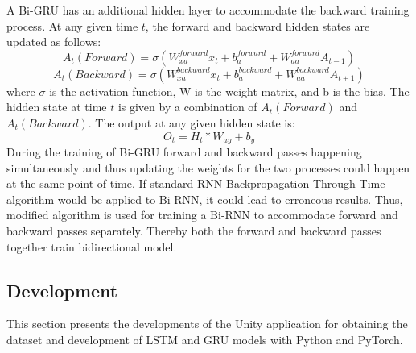 A Bi-GRU has an additional hidden layer to accommodate the backward training process. At any given time 
$t$, the forward and backward hidden states are updated as follows:
\begin{equation}
A_t(Forward) = \sigma (W_{xa}^{forward}x_t + b_{a}^{forward} + W_{aa}^{forward}A_{t-1})
\end{equation}
\begin{equation}
A_t(Backward) = \sigma (W_{xa}^{backward}x_t + b_{a}^{backward} + W_{aa}^{backward}A_{t+1})
\end{equation}
where 
$\sigma$ is the activation function, W is the weight matrix, and b is the bias. The hidden state at time $t$ is given by a combination of $A_t(Forward)$ and $A_t(Backward)$. The output at any given hidden state is:
\begin{equation}
O_t = H_t * W_{ay} + b_y
\end{equation}
During the training of Bi-GRU forward and backward passes happening simultaneously and thus updating the weights for the two processes could happen at the same point of time. If standard RNN Backpropagation Through Time algorithm would be applied to Bi-RNN, it could lead to erroneous results. Thus, modified algorithm is used for training a Bi-RNN to accommodate forward and backward passes separately. Thereby both the forward and backward passes together train bidirectional model. 



\subsection{Development}
\label{sec:impl:model:dev}
This section presents the developments of the Unity application for obtaining the dataset and development of LSTM and GRU models with Python and PyTorch. 

